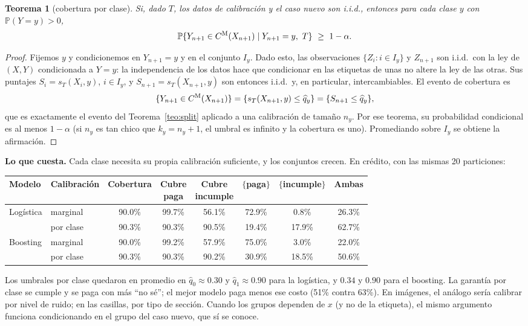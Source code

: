 \documentclass[11pt]{article}
\theoremstyle{plain}
\newtheorem{teorema}{Teorema}[section]
\theoremstyle{definition}
\theoremstyle{remark}
\newcommand{\Prob}{\mathbb P}
\newcommand{\qhat}{\widehat q}
\newcommand{\dest}[1]{\par\needspace{4\baselineskip}\textbf{#1}\quad}
\begin{document}
\begin{teorema}[cobertura por clase]\label{teo:mondrian}
Si, dado $T$, los datos de calibración y el caso nuevo son i.i.d., entonces para cada clase $y$ con
$\Prob(Y=y)>0$,
\[
 \Prob\{Y_{n+1}\in C^{\rm M}(X_{n+1})\mid Y_{n+1}=y,\ T\}\ \ge\ 1-\alpha .
\]
\end{teorema}
\begin{proof}
Fijemos $y$ y condicionemos en $Y_{n+1}=y$ y en el conjunto $I_y$. Dado esto, las observaciones
$\{Z_i: i\in I_y\}$ y $Z_{n+1}$ son i.i.d.\ con la ley de $(X,Y)$ condicionada a $Y=y$: la
independencia de los datos hace que condicionar en las etiquetas de unas no altere la ley de las
otras. Sus puntajes $S_i=s_T(X_i,y)$, $i\in I_y$, y $S_{n+1}=s_T(X_{n+1},y)$ son entonces i.i.d.\ y,
en particular, intercambiables. El evento de cobertura es
\[
 \{Y_{n+1}\in C^{\rm M}(X_{n+1})\}=\{s_T(X_{n+1},y)\le\qhat_y\}=\{S_{n+1}\le\qhat_y\},
\]
que es exactamente el evento del Teorema~\ref{teo:split} aplicado a una calibración de tamaño $n_y$.
Por ese teorema, su probabilidad condicional es al menos $1-\alpha$ (si $n_y$ es tan chico que
$k_y=n_y+1$, el umbral es infinito y la cobertura es uno). Promediando sobre $I_y$ se obtiene la
afirmación.
\end{proof}
\dest{Lo que cuesta.} Cada clase necesita su propia calibración suficiente, y los conjuntos crecen.
En crédito, con las mismas 20 particiones:
\begin{center}
\small\setlength{\tabcolsep}{4pt}
\begin{tabular}{llcccccc}
\toprule
Modelo & Calibración & Cobertura & \shortstack{Cubre\\paga} & \shortstack{Cubre\\incumple} & $\{$paga$\}$ & $\{$incumple$\}$ & Ambas\\
\midrule
Logística & marginal & 90.0\% & 99.7\% & 56.1\% & 72.9\% & 0.8\% & 26.3\%\\
& por clase & 90.3\% & 90.3\% & 90.5\% & 19.4\% & 17.9\% & 62.7\%\\
Boosting & marginal & 90.0\% & 99.2\% & 57.9\% & 75.0\% & 3.0\% & 22.0\%\\
& por clase & 90.3\% & 90.3\% & 90.2\% & 30.9\% & 18.5\% & 50.6\%\\
\bottomrule
\end{tabular}
\end{center}
Los umbrales por clase quedaron en promedio en $\qhat_0\approx0.30$ y $\qhat_1\approx0.90$ para la
logística, y $0.34$ y $0.90$ para el boosting. La garantía por clase se cumple y se paga con más ``no
sé''; el mejor modelo paga menos ese costo (51\% contra 63\%). En imágenes, el análogo sería
calibrar por nivel de ruido; en las casillas, por tipo de sección. Cuando los grupos dependen de $x$
(y no de la etiqueta), el mismo argumento funciona condicionando en el grupo del caso nuevo, que sí
se conoce.
\end{document}
